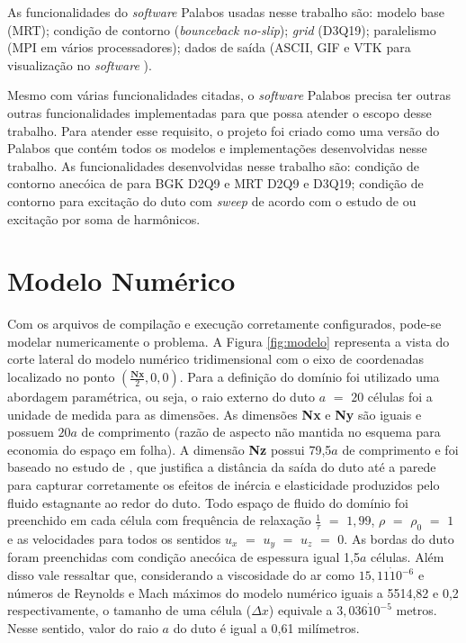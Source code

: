 As funcionalidades do \textit{software} Palabos usadas nesse trabalho são: modelo base (MRT); condição de contorno (\textit{bounceback} \textit{no-slip}); \textit{grid} (D3Q19); paralelismo (MPI em vários processadores); dados de saída (ASCII, GIF e VTK para visualização no \textit{software} ).

Mesmo com várias funcionalidades citadas, o \textit{software} Palabos precisa ter outras outras funcionalidades implementadas para que possa atender o escopo desse trabalho. Para atender esse requisito, o projeto  foi criado como uma versão do Palabos que contém todos os modelos e implementações desenvolvidas nesse trabalho. As funcionalidades desenvolvidas nesse trabalho são: condição de contorno anecóica de  para BGK D2Q9 e MRT D2Q9 e D3Q19; condição de contorno para excitação do duto com \textit{sweep} de acordo com o estudo de  ou excitação por soma de harmônicos.


\section{Modelo Numérico}
\label{sec:modelo_numerico}

Com os arquivos de compilação e execução corretamente configurados, pode-se modelar numericamente o problema. A Figura \ref{fig:modelo} representa a vista do corte lateral do modelo numérico tridimensional com o eixo de coordenadas localizado no ponto $(\frac{\textbf{Nx}}{2}, 0, 0)$. Para a definição do domínio foi utilizado uma abordagem paramétrica, ou seja, o raio externo do duto $a$ $=$ $20$ células foi a unidade de medida para as dimensões. As dimensões \textbf{Nx} e \textbf{Ny} são iguais e possuem $20a$ de comprimento (razão de aspecto não mantida no esquema para economia do espaço em folha). A dimensão \textbf{Nz} possui 79,5$a$ de comprimento e foi baseado no estudo de , que justifica a distância da saída do duto até a parede para capturar corretamente os efeitos de inércia e elasticidade produzidos pelo fluido estagnante ao redor do duto. Todo espaço de fluido do domínio foi preenchido em cada célula com frequência de relaxação $\frac{1}{\tau}$ $=$ $1,99$, $\rho$ $=$ $\rho_{0}$ $=$ $1$ e as velocidades para todos os sentidos $u_{x}$ $=$ $u_{y}$ $=$ $u_{z}$ $=$ $0$. As bordas do duto foram preenchidas com condição anecóica de espessura igual 1,5$a$ células. Além disso vale ressaltar que, considerando a viscosidade do ar como $15,11 \dot 10^{-6}$ e números de Reynolds e Mach máximos do modelo numérico iguais a 5514,82 e 0,2 respectivamente, o tamanho de uma célula ($\Delta x$) equivale a $3,036 \dot 10^{-5}$ metros. Nesse sentido, valor do raio $a$ do duto é igual a 0,61 milímetros.

